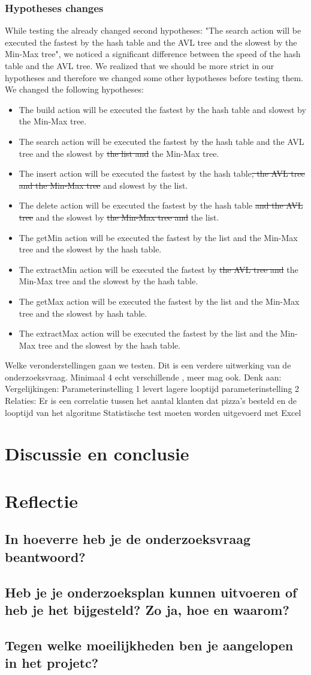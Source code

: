 \documentclass{article}
\begin{document}
\subsubsection{Hypotheses changes}
While testing the already changed second hypotheses: "The search action will be executed the fastest by the hash table and the AVL tree and the slowest by the Min-Max tree", we noticed a significant difference between the speed of the hash table and the AVL tree. We realized that we should be more strict in our hypotheses and therefore we changed some other hypotheses before testing them. We changed the following hypotheses: 
\begin{itemize}
\item The build action will be executed the fastest by the hash table and slowest by the Min-Max tree.
\item The search action will be executed the fastest by the hash table and the AVL tree and the slowest by\sout{ the  list and }the Min-Max tree.
\item The insert action will be executed the fastest by the hash table\sout{, the AVL tree and the Min-Max tree} and slowest by the list.
\item The delete action will be executed the fastest by the hash table \sout{and the AVL tree} and the slowest by \sout{the Min-Max tree and} the list.
\item The getMin action will be executed the fastest by the list and the Min-Max tree and the slowest by the hash table.
\item The extractMin action will be executed the fastest by  \sout{the AVL tree and} the  Min-Max tree and the slowest by the hash table.
\item The getMax action will be executed the fastest by the list and the Min-Max tree and the slowest by hash table.
\item The extractMax action will be executed the fastest by the list and the Min-Max tree and the slowest by the hash table.



\end{itemize}
 Welke veronderstellingen gaan we testen. Dit is een verdere uitwerking van de onderzoeksvraag. Minimaal 4 echt verschillende , meer mag ook. Denk aan:
Vergelijkingen: Parameterinstelling 1 levert lagere looptijd parameterinstelling 2 Relaties: Er is een correlatie tussen het aantal klanten dat pizza's besteld en de looptijd van het algoritme
Statistische test moeten worden uitgevoerd met Excel
\section{Discussie en conclusie}
\section{Reflectie}
\subsection{In hoeverre heb je de onderzoeksvraag beantwoord?}
\subsection{Heb je je onderzoeksplan kunnen uitvoeren of heb je het bijgesteld? Zo ja, hoe en waarom?}
\subsection{Tegen welke moeilijkheden ben je aangelopen in het projetc?}
\end{document}
